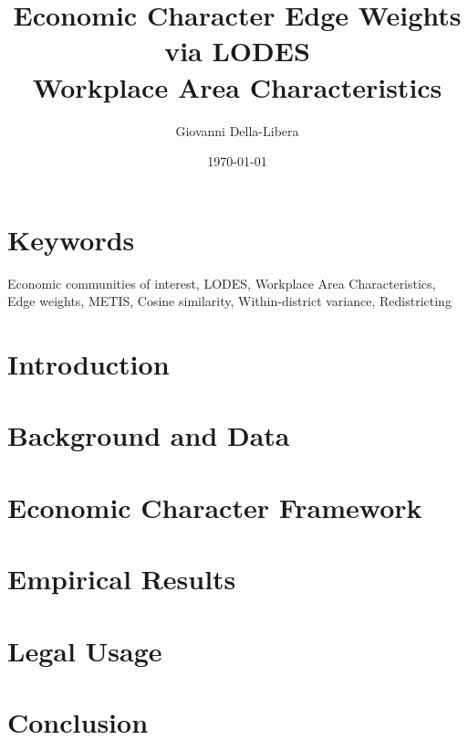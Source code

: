 \documentclass[12pt]{article}
\title{\textbf{Economic Character Edge Weights via LODES\\
Workplace Area Characteristics}}
\author{Giovanni Della-Libera}
\date{\today}
\begin{document}
\maketitle

\begin{abstract}

\end{abstract}

\section*{Keywords}
Economic communities of interest, LODES, Workplace Area Characteristics,
Edge weights, METIS, Cosine similarity, Within-district variance, Redistricting

\section{Introduction}


\section{Background and Data}


\section{Economic Character Framework}


\section{Empirical Results}


\section{Legal Usage}


\section{Conclusion}




\end{document}
